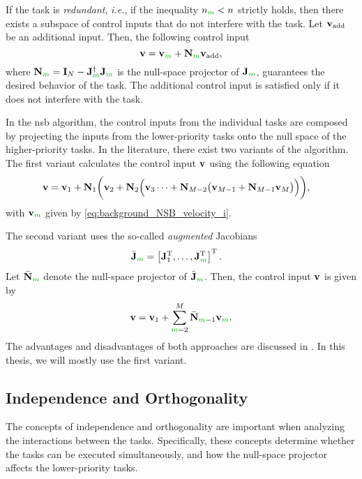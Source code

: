 If the task is \emph{redundant}, \emph{i.e.}, if the inequality $n_{\dm{m}} < n$ strictly holds, then there exists a subspace of control inputs that do not interfere with the task.
Let $\mathbf{v}_{\rm add}$ be an additional input.
Then, the following control input
\begin{equation}
    \ivel = \ivel_{\dm{m}} + \mat{N}_{\dm{m}} \ivel_{\rm add},
\end{equation}
where $\mat{N}_{\dm{m}} = \mat{I}_{N} - \mat{J}_{\dm{m}}^{\dagger}\mat{J}_{\dm{m}}$ is the null-space projector of $\mat{J}_{\dm{m}}$, guarantees the desired behavior of the task.
The additional control input is satisfied only if it does not interfere with the task.

In the \gls{nsb} algorithm, the control inputs from the individual tasks are composed by projecting the inputs from the lower-priority tasks onto the null space of the higher-priority tasks.
In the literature, there exist two variants of the algorithm.
The first variant calculates the control input $\mathbf{v}$ using the following equation
\begin{align}
    \mathbf{v} &= \mathbf{v}_{1} + \mathbf{N}_1 \biggl(\mathbf{v}_{2} + \mathbf{N}_2\Bigl(\mathbf{v}_3 \cdots + \mathbf{N}_{M-2}\bigl(\mathbf{v}_{M-1} + \mathbf{N}_{M-1}\mathbf{v}_M\bigr)\Bigr)\biggr),
    \label{eq:background_NSB_recursive}
\end{align}
with $\ivel_{\dm{m}}$ given by \eqref{eq:background_NSB_velocity_i}.

The second variant uses the so-called \emph{augmented} Jacobians
\begin{align}
    \Bar{\mat{J}}_{\dm{m}} &= \inlinevector{\mat{J}_1\T, \ldots, \mat{J}_{\dm{m}}\T}.
    \label{eq:background_NSB_augmented}
\end{align}
Let $\Bar{\mat{N}}_{\dm{m}}$ denote the null-space projector of $\Bar{\mat{J}}_{\dm{m}}$.
Then, the control input $\mathbf{v}$ is given by
\begin{equation}
    \ivel = \ivel_1 + \sum_{\dm{m}=2}^M \Bar{\mat{N}}_{\dm{m}-1} \ivel_{\dm{m}}.
\end{equation}
The advantages and disadvantages of both approaches are discussed in \cite{antonelli_stability_2008}.
In this thesis, we will mostly use the first variant.

\subsection{Independence and Orthogonality}
\label{sec:background_NSB_independence}
The concepts of independence and orthogonality are important when analyzing the interactions between the tasks.
Specifically, these concepts determine whether the tasks can be executed simultaneously, and how the null-space projector affects the lower-priority tasks.

